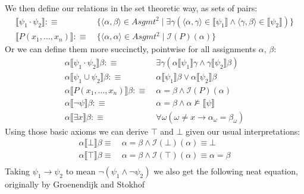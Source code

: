 \documentclass[12pt]{article}
\begin{document}
We then define our relations in the set theoretic way, as sets of pairs:
\begin{align}
\llbracket\psi_1\cdot\psi_2\rrbracket :\equiv&\ \{\langle\alpha,\beta\rangle \in Asgmt^2 \mid \exists\gamma(\langle\alpha,\gamma\rangle\in\llbracket\psi_1\rrbracket\wedge\langle\gamma,\beta\rangle\in\llbracket\psi_2\rrbracket)\} \label{sem_set_and} \\
\llbracket P(x_1,\dots,x_n)\rrbracket :\equiv&\ \{\langle\alpha,\alpha\rangle \in Asgmt^2 \mid \mathcal{I}(P)(\alpha)\} \label{sem_set_pred}
\end{align}
%
Or we can define them more succinctly, pointwise for all assignments $\alpha$, $\beta$:
\begin{align}
\alpha\llbracket \psi_1\cdot\psi_2\rrbracket \beta :\equiv&\ \exists\gamma (\alpha\llbracket \psi_1\rrbracket \gamma \wedge \gamma\llbracket \psi_2\rrbracket \beta) \label{sem_and} \\
\alpha\llbracket \psi_1\cup\psi_2\rrbracket \beta :\equiv&\ \alpha\llbracket \psi_1\rrbracket \beta \vee \alpha\llbracket \psi_2\rrbracket \beta \label{sem_union} \\
\alpha\llbracket P(x_1,\dots,x_n)\rrbracket \beta :\equiv&\ \alpha = \beta \wedge \mathcal{I}(P)(\alpha) \label{sem_pred} \\
\alpha\llbracket \neg\psi\rrbracket \beta :\equiv&\ \alpha = \beta \wedge \alpha\not\models\llbracket \psi\rrbracket  \label{sem_neg}\\
\alpha\llbracket \exists x\rrbracket \beta :\equiv&\ \forall\omega (\omega \neq x \rightarrow \alpha_{\omega} = \beta_{\omega}) \label{sem_exists}
\end{align}
%
Using those basic axioms we can derive $\top$ and $\bot$ given our usual interpretations:
\begin{align}
\alpha\llbracket \bot\rrbracket \beta \equiv&\ \alpha = \beta \wedge \mathcal{I}(\bot)(\alpha) \equiv \bot \label{sem_bot}\\
\alpha\llbracket \top\rrbracket \beta \equiv&\ \alpha = \beta \wedge \mathcal{I}(\top)(\alpha) \equiv \alpha = \beta \label{sem_top}\\
\end{align}
%
Taking $\psi_1\rightarrow\psi_2$ to mean $\neg(\psi_1\wedge\neg\psi_2)$ we also get the following neat equation, originally by Groenendijk and Stokhof\cite{groenendijk1991dynamic}
\end{document}

